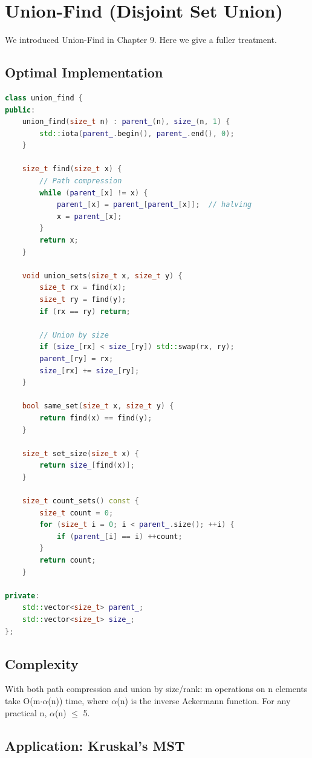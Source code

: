 \section{Union-Find (Disjoint Set Union)}\label{sec:union-find}

We introduced Union-Find in Chapter 9. Here we give a fuller treatment.

\subsection{Optimal Implementation}

\begin{lstlisting}[language=C++]
class union_find {
public:
    union_find(size_t n) : parent_(n), size_(n, 1) {
        std::iota(parent_.begin(), parent_.end(), 0);
    }

    size_t find(size_t x) {
        // Path compression
        while (parent_[x] != x) {
            parent_[x] = parent_[parent_[x]];  // halving
            x = parent_[x];
        }
        return x;
    }

    void union_sets(size_t x, size_t y) {
        size_t rx = find(x);
        size_t ry = find(y);
        if (rx == ry) return;

        // Union by size
        if (size_[rx] < size_[ry]) std::swap(rx, ry);
        parent_[ry] = rx;
        size_[rx] += size_[ry];
    }

    bool same_set(size_t x, size_t y) {
        return find(x) == find(y);
    }

    size_t set_size(size_t x) {
        return size_[find(x)];
    }

    size_t count_sets() const {
        size_t count = 0;
        for (size_t i = 0; i < parent_.size(); ++i) {
            if (parent_[i] == i) ++count;
        }
        return count;
    }

private:
    std::vector<size_t> parent_;
    std::vector<size_t> size_;
};
\end{lstlisting}

\subsection{Complexity}

With both path compression and union by size/rank: m operations on n elements take O(m$\cdot $$\alpha $(n)) time, where $\alpha $(n) is the inverse Ackermann function. For any practical n, $\alpha $(n) $\le $ 5.

\subsection{Application: Kruskal's MST}

